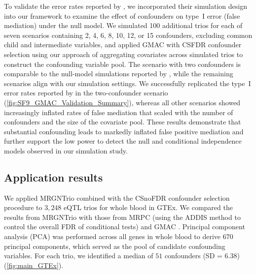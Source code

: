 \documentclass[12pt,letterpaper]{report}
\begin{document}
\begin{doublespace}
To validate the error rates reported by \cite{yang2017identifying}, we incorporated their simulation design into our framework to examine the effect of confounders on type~I error (false mediation) under the null model. We simulated 100 additional trios for each of seven scenarios containing 2, 4, 6, 8, 10, 12, or 15 confounders, excluding common child and intermediate variables, and applied GMAC with CSFDR confounder selection using our approach of aggregating covariates across simulated trios to construct the confounding variable pool. The scenario with two confounders is comparable to the null-model simulations reported by \cite{yang2017identifying}, while the remaining scenarios align with our simulation settings. We successfully replicated the type~I error rates reported by \cite{yang2017identifying} in the two-confounder scenario (\autoref{fig:SF9_GMAC_Validation_Summary}), whereas all other scenarios showed increasingly inflated rates of false mediation that scaled with the number of confounders and the size of the covariate pool. These results demonstrate that substantial confounding leads to markedly inflated false positive mediation and further support the low power to detect the null and conditional independence models observed in our simulation study.




\subsection{Application results}

We applied MRGNTrio combined with the CSnoFDR confounder selection procedure to $3{,}248$ eQTL trios for whole blood in GTEx. We compared the results from MRGNTrio with those from MRPC (using the ADDIS method to control the overall FDR of conditional tests) and GMAC \cite{badsha2019learning,yang2017gmac}. Principal component analysis (PCA) was performed across all genes in whole blood to derive $670$ principal components, which served as the pool of candidate confounding variables. For each trio, we identified a median of $51$ confounders (SD = $6.38$) (\autoref{fig:main_GTEx}). 


\end{doublespace}
\end{document}
